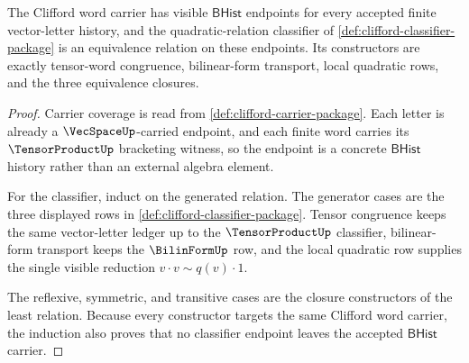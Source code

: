 \begin{theorem}\label{thm:clifford-carrier-classifier-obligations}
The Clifford word carrier has visible $\mathsf{BHist}$ endpoints for every accepted
finite vector-letter history, and the quadratic-relation classifier of
\autoref{def:clifford-classifier-package} is an equivalence
relation on these endpoints. Its constructors are exactly tensor-word
congruence, bilinear-form transport, local quadratic rows, and the three
equivalence closures.
\end{theorem}
\begin{proof}
Carrier coverage is read from \autoref{def:clifford-carrier-package}. Each
letter is already a $\VecSpaceUp$-carried endpoint, and each finite word carries its
$\TensorProductUp$ bracketing witness, so the endpoint is a concrete $\mathsf{BHist}$
history rather than an external algebra element.

For the classifier, induct on the generated relation. The generator cases are
the three displayed rows in
\autoref{def:clifford-classifier-package}. Tensor congruence keeps
the same vector-letter ledger up to the $\TensorProductUp$ classifier, bilinear-form
transport keeps the $\BilinFormUp$ row, and the local quadratic row supplies the single
visible reduction $v \cdot v \sim q(v) \cdot 1$.

The reflexive, symmetric, and transitive cases are the closure constructors
of the least relation. Because every constructor targets the same Clifford
word carrier, the induction also proves that no classifier endpoint leaves
the accepted $\mathsf{BHist}$ carrier.
\end{proof}

